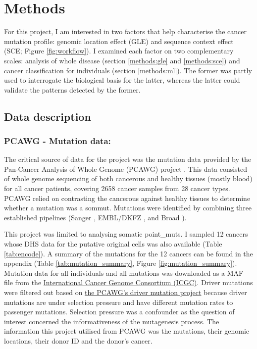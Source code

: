 \chapter{Methods}\label{methods}

For this project, I am interested in two factors that help characterise the cancer mutation profile: genomic location effect (GLE) and sequence context effect (SCE; Figure \ref{fig:workflow}). I examined each factor on two complementary scales: analysis of whole disease (section \ref{methods:gle} and \ref{methods:sce}) and cancer classification for individuals (section \ref{methods:ml}). The former was partly used to interrogate the biological basis for the latter, whereas the latter could validate the patterns detected by the former.



\section{Data description}
\subsection{PCAWG - Mutation data:} 
The critical source of data for the project was the mutation data provided by the Pan-Cancer Analysis of Whole Genome (PCAWG) project \citep{Campbell2020}. This data consisted of whole genome sequencing of both cancerous and healthy tissues (mostly blood) for all cancer patients, covering 2658 cancer samples from 28 cancer types. PCAWG relied on contrasting the cancerous against healthy tissues to determine whether a mutation was a \gls{sommut}. Mutations were identified by combining three established pipelines (Sanger \citep{Jones2016CgpCaVEManWrapper:Data}, EMBL/DKFZ \citep{Rimmer2014IntegratingApplications}, and Broad \citep{Cibulskis2013SensitiveSamples}).

This project was limited to analysing somatic \glspl{point_mut}. I sampled 12 cancers whose DHS data for the putative original cells was also available (Table \ref{tab:encode}). A summary of the mutations for the 12 cancers can be found in the appendix (Table \ref{tab:mutation_summary}, Figure \ref{fig:mutation_summary}). Mutation data for all individuals and all mutations was downloaded as a MAF file from the \href{https://dcc.icgc.org/releases/PCAWG/consensus_snv_indel}{International Cancer Genome Consortium (ICGC)}. Driver mutations were filtered out based on \href{https://dcc.icgc.org/releases/PCAWG/driver_mutations}{the PCAWG's driver mutation project} because driver mutations are under selection pressure and have different mutation rates to passenger mutations. Selection pressure was a confounder as the question of interest concerned the informativeness of the mutagenesis process. The information this project utilised from PCAWG was the mutations, their genomic locations, their donor ID and the donor's cancer. 


